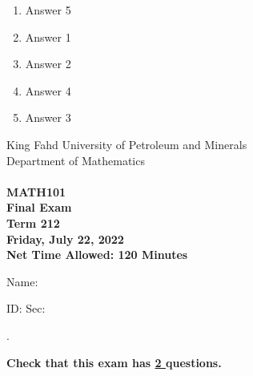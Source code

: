 \documentclass[amsfonts,bezier,leqno,fleqn,12pt,a4paper]{article}
\begin{document}
{{{\begin{large}
\begin{enumerate}
\begin{enumerate}
\item  Answer 5
\item  Answer 1
\item  Answer 2
\item  Answer 4
\item  Answer 3

\end{enumerate}
\newpage


\end{enumerate}
\end{large}


\newpage


\thispagestyle{empty}
\begin{center}
    \begin{large}
        King Fahd University of Petroleum and Minerals \\ 
        Department of Mathematics  \\ 
        \vspace*{4.5cm}
        {\bf {} }  \hfill {\bf {}} \\
        {\bf MATH101 }  \\
        {\bf Final Exam }  \\
        {\bf Term 212 }  \\
        {\bf Friday, July 22, 2022 }  \\ 
        {\bf Net Time Allowed: 120 Minutes }  \\
        \vspace*{0.2cm}

    \end{large}
\end{center}

\large{Name:  }\hrulefill

\vspace{3mm}

\large{ID: } \hrulefill \large{  Sec: } \hrulefill \large{.

\vspace{1cm}

\large{\bf{Check that this exam has {\underline{ 2 }} questions.}}

\vspace{1cm}

}}}}
\end{document}

